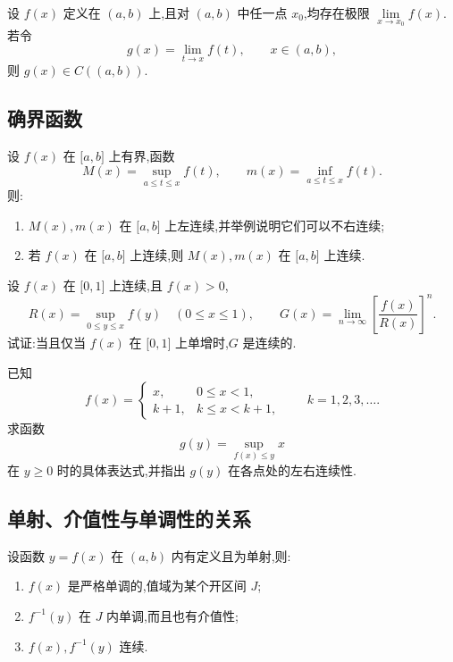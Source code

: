 \documentclass[../数学分析培优讲义.tex]{subfiles}
\begin{document}
\begin{example}
设 $f(x)$ 定义在 $(a,b)$ 上,且对 $(a,b)$ 中任一点 $x_0$,均存在极限 $\displaystyle\lim\limits_{x\to x_0}f(x)$.若令
\[
    g(x)=\lim\limits_{t\to x}f(t),
    \qquad x\in(a,b),
\]
则 $g(x)\in C((a,b))$.
\end{example}
\exampleblank


\newpage

\subsection{确界函数}

\begin{example}
设 $f(x)$ 在 $\lbrack a,b\rbrack$ 上有界,函数
\[
    M(x)=\sup\limits_{a\leq t\leq x}f(t),
    \qquad
    m(x)=\inf\limits_{a\leq t\leq x}f(t).
\]
则:
\begin{enumerate}[label=(\arabic*)]
    \item $M(x),m(x)$ 在 $\lbrack a,b\rbrack$ 上左连续,并举例说明它们可以不右连续;
    \item 若 $f(x)$ 在 $\lbrack a,b\rbrack$ 上连续,则 $M(x),m(x)$ 在 $\lbrack a,b\rbrack$ 上连续.
\end{enumerate}
\end{example}
\exampleblank

\begin{example}
设 $f(x)$ 在 $\lbrack 0,1\rbrack$ 上连续,且 $f(x)>0$,
\[
    R(x)=\sup\limits_{0\leq y\leq x}f(y)\quad(0\leq x\leq1),
    \qquad
    G(x)=\lim\limits_{n\to\infty}\left[\dfrac{f(x)}{R(x)}\right]^n.
\]
试证:当且仅当 $f(x)$ 在 $\lbrack 0,1\rbrack$ 上单增时,$G$ 是连续的.
\end{example}
\exampleblank

\begin{example}
已知
\[
f(x)=
\begin{cases}
    x, & 0\leq x<1,\\
    k+1, & k\leq x<k+1,
\end{cases}
\qquad k=1,2,3,\ldots.
\]
求函数
\[
    g(y)=\sup\limits_{f(x)\leq y}x
\]
在 $y\geq0$ 时的具体表达式,并指出 $g(y)$ 在各点处的左右连续性.
\end{example}
\exampleblank


\newpage

\subsection{单射、介值性与单调性的关系}

\begin{proposition}[\markstar]
设函数 $y=f(x)$ 在 $(a,b)$ 内有定义且为单射,则:
\begin{enumerate}[label=(\arabic*)]
    \item $f(x)$ 是严格单调的,值域为某个开区间 $J$;
    \item $f^{-1}(y)$ 在 $J$ 内单调,而且也有介值性;
    \item $f(x),f^{-1}(y)$ 连续.
\end{enumerate}
\end{proposition}
\end{document}
